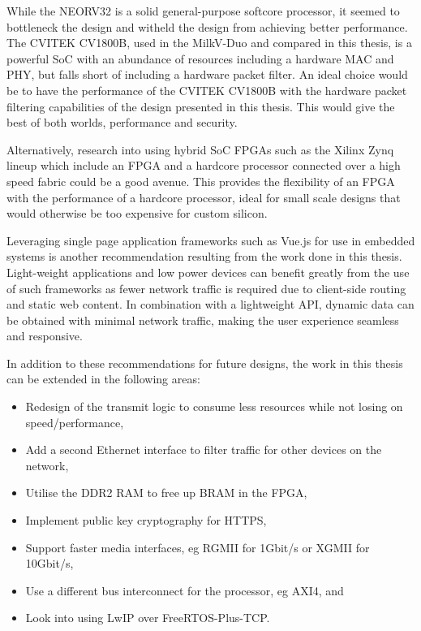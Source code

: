 While the NEORV32 is a solid general-purpose softcore processor, it seemed to bottleneck the design and witheld the design from achieving better performance. The CVITEK CV1800B, used in the MilkV-Duo and compared in this thesis, is a powerful SoC with an abundance of resources including a hardware MAC and PHY, but falls short of including a hardware packet filter. An ideal choice would be to have the performance of the CVITEK CV1800B with the hardware packet filtering capabilities of the design presented in this thesis. This would give the best of both worlds, performance and security.

Alternatively, research into using hybrid SoC FPGAs such as the Xilinx Zynq lineup which include an FPGA and a hardcore processor connected over a high speed fabric could be a good avenue. This provides the flexibility of an FPGA with the performance of a hardcore processor, ideal for small scale designs that would otherwise be too expensive for custom silicon.

Leveraging single page application frameworks such as Vue.js for use in embedded systems is another recommendation resulting from the work done in this thesis. Light-weight applications and low power devices can benefit greatly from the use of such frameworks as fewer network traffic is required due to client-side routing and static web content. In combination with a lightweight API, dynamic data can be obtained with minimal network traffic, making the user experience seamless and responsive.

In addition to these recommendations for future designs, the work in this thesis can be extended in the following areas:

\begin{itemize}
    \item Redesign of the transmit logic to consume less resources while not losing on speed/performance, 
    \item Add a second Ethernet interface to filter traffic for other devices on the network, 
    \item Utilise the DDR2 RAM to free up BRAM in the FPGA, 
    \item Implement public key cryptography for HTTPS,
    \item Support faster media interfaces, eg RGMII for 1Gbit/s or XGMII for 10Gbit/s,
    \item Use a different bus interconnect for the processor, eg AXI4, and
    \item Look into using LwIP over FreeRTOS-Plus-TCP.
\end{itemize}




